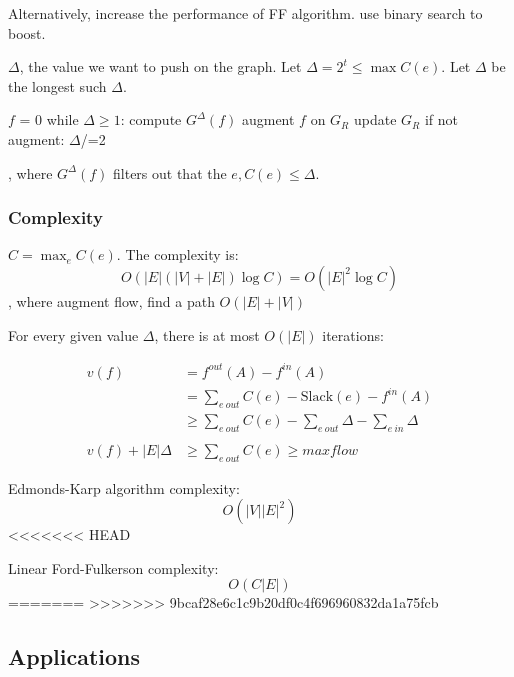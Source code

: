 \documentclass[a4paper]{report}
\theoremstyle{definition}
\begin{document}
Alternatively, increase the performance of FF algorithm. use binary search to boost.

$\Delta$, the value we want to push on the graph. Let $\Delta=2^t \leq \max C(e)$. Let $\Delta$ be the longest such $\Delta$.
\begin{python}[mathescape]
$f$ = 0
while $\Delta\geq 1$:
  compute $G^\Delta(f)$
  augment $f$ on $G_R$
  update $G_R$
  if not augment:
    $\Delta$/=2
\end{python}
, where $G^\Delta(f)$ filters out that the $e, C(e)\leq \Delta$.
\subsubsection{Complexity}
$C = \max_{e}C(e)$. The complexity is:
$$
O(|E|(|V|+|E|)\log C) = O(|E|^2 \log C)
$$
, where augment flow, find a path $O(|E|+|V|)$

For every given value $\Delta$, there is at most $O(|E|)$ iterations:

\begin{align*}
v(f) &= f^{out}(A)-f^{in}(A) \\
&= \sum_{e~out}C(e)-\text{Slack}(e)-f^{in}(A) \\
&\geq \sum_{e~out}C(e)-\sum_{e~out}\Delta-\sum_{e~in}\Delta \\
\\
v(f)+|E|\Delta &\geq \sum_{e~out}C(e) \geq maxflow
\end{align*}

Edmonds-Karp algorithm complexity:
$$
O(|V||E|^2)
$$
<<<<<<< HEAD

Linear Ford-Fulkerson complexity:
$$
O(C|E|)
$$
=======
>>>>>>> 9bcaf28e6c1c9b20df0c4f696960832da1a75fcb
\subsection{Applications}
\end{document}
